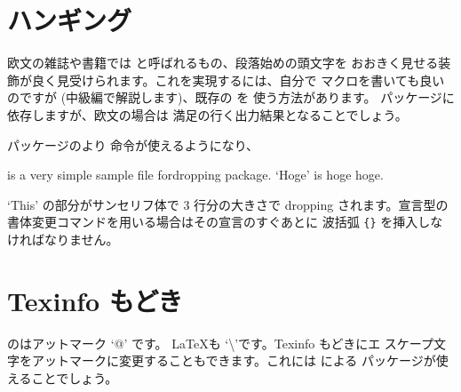 
\section{ハンギング\texorpdfstring{\zdash}{---}}
欧文の雑誌や書籍では  と呼ばれるもの、段落始めの頭文字を
おおきく見せる装飾が良く見受けられます。これを実現するには、自分で
マクロを書いても良いのですが (中級編で解説します)、既存の  を
使う方法があります。 パッケージに依存しますが、欧文の場合は
満足の行く出力結果となることでしょう。
\begin{Syntax}
 
\end{Syntax}

パッケージのより  命令が使えるようになり、
\begin{InOut}
\usepackage{dropping}
 is a very 
 simple sample file fordropping package. 
`Hoge' is hoge hoge.
\end{InOut}
`This' の部分がサンセリフ体で 3 行分の大きさで {dropping} 
されます。宣言型の書体変更コマンドを用いる場合はその宣言のすぐあとに
波括弧 \verb|{}| を挿入しなければなりません。


\section{Texinfo もどき\texorpdfstring{\zdash}{---}}

 のはアットマーク `@' です。
\LaTeX も  `\textbackslash'です。Texinfo もどきにエ
スケープ文字をアットマークに変更することもできます。これには
による  パッケージが使えることでしょう。

